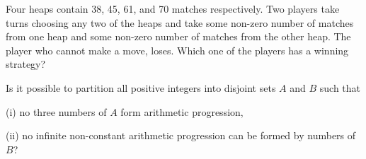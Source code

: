 \prob %
Four heaps contain 38, 45, 61, and 70 matches respectively. Two players
take turns choosing any two of the heaps and take some
non-zero number of matches from one heap and some
non-zero number of matches from the other heap.
The player who cannot make a move, loses. Which one of the players
has a winning strategy?




\prob %
Is it possible to partition all positive integers into disjoint sets $A$
and $B$ such that

\item{(i)} no three numbers of $A$ form arithmetic progression,

\item{(ii)} no infinite non-constant
arithmetic progression can be formed by numbers
of $B$?


\bye
